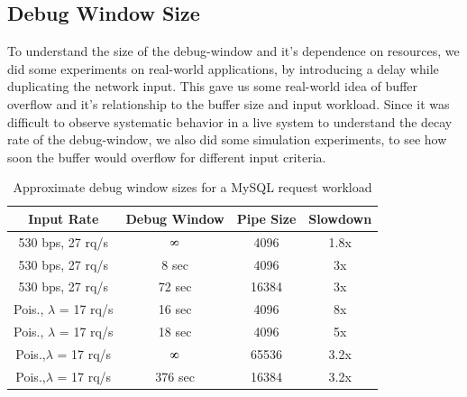 \subsection{Debug Window Size}
\label{sec:parikshanTimewindowPerformance}

To understand the size of the debug-window and it's dependence on resources, we did some experiments on real-world applications, by introducing a delay while duplicating the network input.
This gave us some real-world idea of buffer overflow and it's relationship to the buffer size and input workload.
Since it was difficult to observe systematic behavior in a live system to understand the decay rate of the debug-window, we also did some simulation experiments, to see how soon the buffer would overflow for different input criteria.


\begin{table}[ht]
	\centering
	\setlength{\tabcolsep}{2pt}
	\begin{tabular}{c c c c }
		\toprule
		{\bf Input Rate} & \textbf{Debug Window} & \textbf{Pipe Size} & \textbf{Slowdown} \\ \midrule
		530 bps, 27 rq/s & $\infinity$ & 4096 & 1.8x \\ %
		530 bps, 27 rq/s & 8 sec & 4096 & 3x \\ %
		530 bps, 27 rq/s & 72 sec & 16384 & 3x \\ %
		Pois., $\lambda$ = 17 rq/s & 16 sec & 4096 & 8x \\ %
		Pois., $\lambda$ = 17 rq/s & 18 sec & 4096 & 5x \\ %
		Pois.,$\lambda$ = 17 rq/s & $\infinity$ & 65536 & 3.2x \\ %
		Pois.,$\lambda$ = 17 rq/s & 376 sec & 16384 & 3.2x \\ %
		\bottomrule
	\end{tabular}
	\caption{Approximate debug window sizes for a MySQL request workload}
	\label{table:timewindow}
\end{table}

